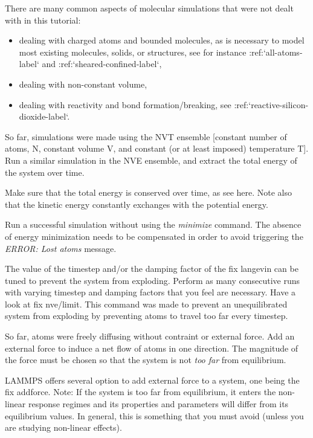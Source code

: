 There are many common aspects of molecular simulations that were not dealt with in this
tutorial:
\begin{itemize}
\item dealing with charged atoms and bounded molecules, as is necessary to model most existing molecules, solids, or structures, see for instance :ref:`all-atoms-label` and :ref:`sheared-confined-label`,
\item dealing with non-constant volume,
\item dealing with reactivity and bond formation/breaking, see :ref:`reactive-silicon-dioxide-label`.
\end{itemize}

So far, simulations were made using the NVT ensemble [constant number 
of atoms, N, constant volume V, and constant (or at least imposed)
temperature T].
Run a similar simulation in the NVE ensemble, and extract the
total energy of the system over time.

\begin{tcolorbox}[colback=mylightblue!5!white,colframe=mylightblue!75!black,title=Expected output]
Make sure that the total energy is conserved over time, as see here. Note also 
that the kinetic energy constantly exchanges with the potential energy.
\end{tcolorbox}

Run a successful simulation without using the \textit{minimize} command.
The absence of energy minimization needs to be compensated
in order to avoid triggering the \textit{ERROR: Lost atoms} message.

\begin{tcolorbox}[colback=mylightblue!5!white,colframe=mylightblue!75!black,title=Hints]
The value of the timestep and/or the damping factor of the fix langevin
can be tuned to prevent the system from exploding.
Perform as many consecutive runs with varying timestep and damping
factors that you feel are necessary.
Have a look at fix nve/limit. This command was
made to prevent an unequilibrated system from exploding
by preventing atoms to travel too far every timestep.
\end{tcolorbox}

So far, atoms were freely diffusing without contraint or external force.
Add an external force to induce a net flow of atoms in one
direction. The magnitude of the force must be chosen so
that the system is not \textit{too far} from equilibrium.

\begin{tcolorbox}[colback=mylightblue!5!white,colframe=mylightblue!75!black,title=Hints]
LAMMPS offers several option to add external force to a system, one 
being the fix addforce.
Note: If the system is too far from equilibrium, it enters the non-linear response 
regimes and its properties and parameters will differ from its equilibrium values.
In general, this is something that you must avoid (unless you are studying
non-linear effects). 
\end{tcolorbox}

